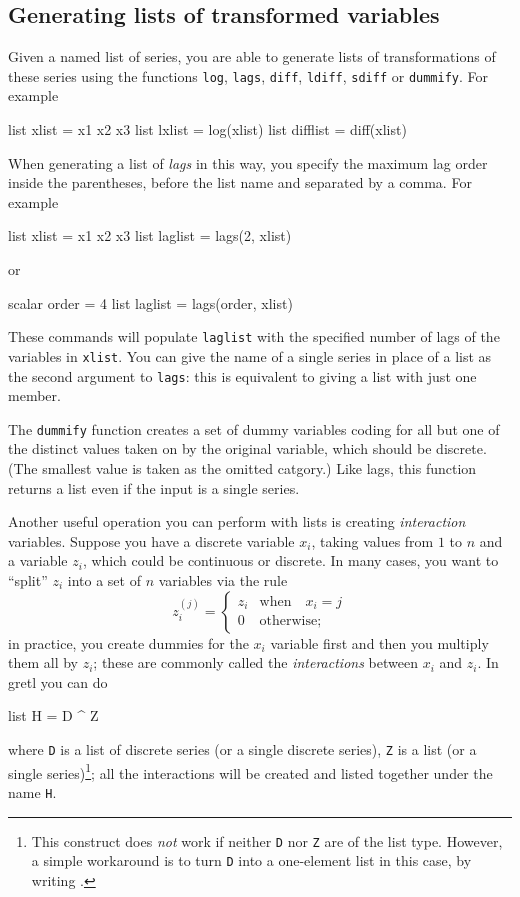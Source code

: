 \subsection{Generating lists of transformed variables}
\label{sec:transform-lists}

Given a named list of series, you are able to generate lists of
transformations of these series using the functions \texttt{log},
\texttt{lags}, \texttt{diff}, \texttt{ldiff}, \texttt{sdiff} or
\texttt{dummify}.  For example
%
\begin{code}
list xlist = x1 x2 x3
list lxlist = log(xlist)
list difflist = diff(xlist)
\end{code}

When generating a list of \textit{lags} in this way, you specify the
maximum lag order inside the parentheses, before the list name and
separated by a comma.  For example
%
\begin{code}
list xlist = x1 x2 x3
list laglist = lags(2, xlist)
\end{code}
%
or
%
\begin{code}
scalar order = 4
list laglist = lags(order, xlist)
\end{code}

These commands will populate \texttt{laglist} with the specified
number of lags of the variables in \texttt{xlist}.  You can give the
name of a single series in place of a list as the second argument to
\texttt{lags}: this is equivalent to giving a list with just one
member.

The \texttt{dummify} function creates a set of dummy variables coding
for all but one of the distinct values taken on by the original
variable, which should be discrete.  (The smallest value is taken as
the omitted catgory.)  Like lags, this function returns a list even if
the input is a single series.

Another useful operation you can perform with lists is creating
\emph{interaction} variables. Suppose you have a discrete variable
$x_i$, taking values from $1$ to $n$ and a variable $z_i$, which could
be continuous or discrete. In many cases, you want to ``split'' $z_i$
into a set of $n$ variables via the rule
\[
z^{(j)}_i =\left\{ 
    \begin{array}{ll}
      z_i & \mathrm{when} \quad x_i = j \\
      0 & \mathrm{otherwise;}
    \end{array}
    \right. 
\] 
in practice, you create dummies for the $x_i$ variable first and then
you multiply them all by $z_i$; these are commonly called the
\emph{interactions} between $x_i$ and $z_i$. In gretl you can do 
\begin{code}
  list H = D ^ Z
\end{code}
where \texttt{D} is a list of discrete series (or a single discrete
series), \texttt{Z} is a list (or a single series)\footnote{
  This construct does \emph{not} work if neither \texttt{D} nor
  \texttt{Z} are of the list type. However, a simple workaround is
  to turn \texttt{D} into a one-element list in this case, by writing
  .}; all the interactions will be
created and listed together under the name \texttt{H}.

